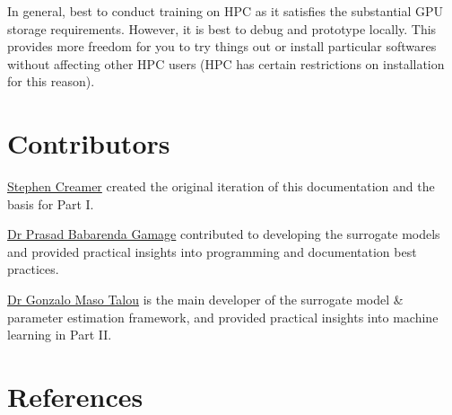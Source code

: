 \documentclass[11pt]{article}
\begin{document}
In general, best to conduct training on HPC as it satisfies the substantial GPU storage requirements. However, it is best to debug and prototype locally. This provides more freedom for you to try things out or install particular softwares without affecting other HPC users (HPC has certain restrictions on installation for this reason). 

\pagebreak

\section{Contributors}
\href{https://unidirectory.auckland.ac.nz/profile/scre583}{Stephen Creamer} created the original iteration of this documentation and the basis for Part I. 

\href{https://unidirectory.auckland.ac.nz/profile/psam012}{Dr Prasad Babarenda Gamage} contributed to developing the surrogate models and provided practical insights into programming and documentation best practices.   

\href{https://unidirectory.auckland.ac.nz/profile/g-masotalou}{Dr Gonzalo Maso Talou} is the main developer of the surrogate model \& parameter estimation framework, and provided practical insights into machine learning in Part II.

\section{References}
    
\end{document}
